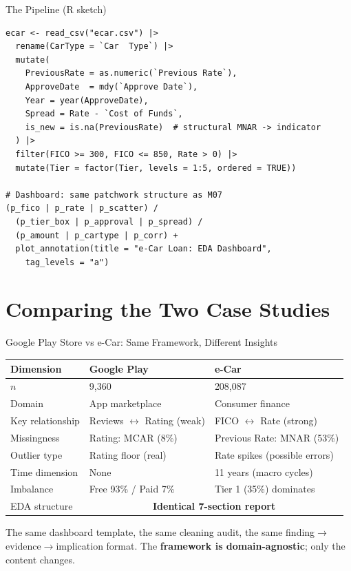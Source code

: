 \documentclass[10pt]{beamer}
\begin{document}
\begin{frame}[fragile]{The Pipeline (R sketch)}
\begin{lstlisting}[style=rstyle]
ecar <- read_csv("ecar.csv") |>
  rename(CarType = `Car  Type`) |>
  mutate(
    PreviousRate = as.numeric(`Previous Rate`),
    ApproveDate  = mdy(`Approve Date`),
    Year = year(ApproveDate),
    Spread = Rate - `Cost of Funds`,
    is_new = is.na(PreviousRate)  # structural MNAR -> indicator
  ) |>
  filter(FICO >= 300, FICO <= 850, Rate > 0) |>
  mutate(Tier = factor(Tier, levels = 1:5, ordered = TRUE))

# Dashboard: same patchwork structure as M07
(p_fico | p_rate | p_scatter) /
  (p_tier_box | p_approval | p_spread) /
  (p_amount | p_cartype | p_corr) +
  plot_annotation(title = "e-Car Loan: EDA Dashboard",
    tag_levels = "a")
\end{lstlisting}
\end{frame}

\section{Comparing the Two Case Studies}

\begin{frame}{Google Play Store vs e-Car: Same Framework, Different Insights}
  \centering
  {\small
  \begin{tabular}{lll}
    \toprule
    \textbf{Dimension} & \textbf{Google Play} & \textbf{e-Car} \\
    \midrule
    $n$ & 9,360 & 208,087 \\
    Domain & App marketplace & Consumer finance \\
    Key relationship & Reviews $\leftrightarrow$ Rating (weak) & FICO $\leftrightarrow$ Rate (strong) \\
    Missingness & Rating: MCAR (8\%) & Previous Rate: MNAR (53\%) \\
    Outlier type & Rating floor (real) & Rate spikes (possible errors) \\
    Time dimension & None & 11 years (macro cycles) \\
    Imbalance & Free 93\% / Paid 7\% & Tier 1 (35\%) dominates \\
    \midrule
    EDA structure & \multicolumn{2}{c}{\textbf{Identical 7-section report}} \\
    \bottomrule
  \end{tabular}}
  \vspace{6pt}
  {\small The same dashboard template, the same cleaning audit, the same
  finding$\rightarrow$evidence$\rightarrow$implication format. The
  \textbf{framework is domain-agnostic}; only the content changes.}
\end{frame}
\end{document}
